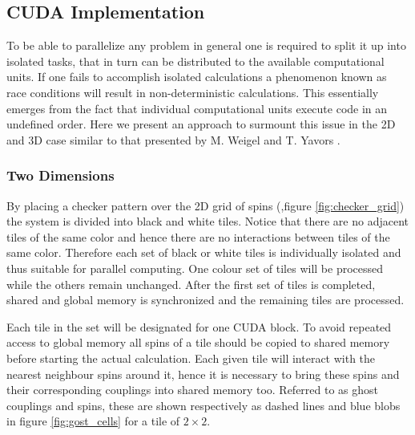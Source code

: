 \documentclass[paper=a4, fontsize=11pt]{scrartcl} %
\numberwithin{equation}{section} %
\numberwithin{figure}{section} %
\numberwithin{table}{section} %
\begin{document}
\subsection{CUDA Implementation}
To be able to parallelize any problem in general one is required to split it up into isolated tasks, that in turn can be distributed to the available computational units. If one fails to accomplish isolated calculations a phenomenon known as race conditions will result in non-deterministic calculations. This essentially emerges from the fact that individual computational units execute code in an undefined order. Here we present an approach to surmount this issue in the 2D and 3D case similar to that presented by M. Weigel and T. Yavors \cite{gpu_mc_spins}.

\subsubsection{Two Dimensions}
By placing a checker pattern over the 2D grid of spins (,figure \ref{fig:checker_grid}) the system is divided into black and white tiles. Notice that there are no adjacent tiles of the same color and hence there are no interactions between tiles of the same color. Therefore each set of black or white tiles is individually isolated and thus suitable for parallel computing. One colour set of tiles will be processed while the others remain unchanged. After the first set of tiles is completed, shared and global memory is synchronized and the remaining tiles are processed.

Each tile in the set will be designated for one CUDA block. To avoid repeated access to global memory all spins of a tile should be copied to shared memory before starting the actual calculation. Each given tile will interact with the nearest neighbour spins around it, hence it is necessary to bring these spins and their corresponding couplings into shared memory too. Referred to as ghost couplings and spins, these are shown respectively as dashed lines and blue blobs in figure \ref{fig:gost_cells} for a tile of $2\times2$.
\end{document}
